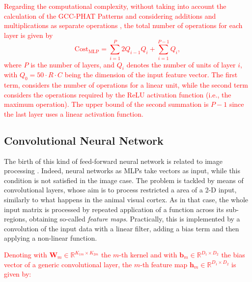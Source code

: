 \documentclass[review]{elsarticle}
\begin{document}
\textcolor{red}{Regarding the computational complexity, without taking into account the calculation of the GCC-PHAT Patterns and considering additions and multiplications as separate operations \cite{DoSY07}, the total number of operations for each layer is given by 
\begin{equation}
\text{Cost}_{\text{MLP}} = \sum_{i=1}^P 2Q_{i-1}Q_i + \sum_{i=1}^{P-1} Q_i ,
\end{equation}
where $P$ is the number of layers, and $Q_i$ denotes the number of units of layer $i$, with $Q_0=50\cdot R \cdot C$ being the dimension of the input feature vector. The first term, considers the number of operations for a linear unit, while the second term considers the operations required by the ReLU activation function (i.e., the maximum operation). The upper bound of the second summation is $P-1$ since the last layer uses a linear activation function.
}

\subsection{Convolutional Neural Network}
\label{sec:CNN}
The birth of this kind of feed-forward neural network is related to image processing \cite{lawrence1997face}. Indeed, neural networks as MLPs take vectors as input, while this condition is not satisfied in the image case. The problem is tackled by means of convolutional layers, whose aim is to process restricted a area of a 2-D input, similarly to what happens in the animal visual cortex.
As in that case, the whole input matrix is processed by repeated application of a function across its sub-regions, obtaining so-called \textit{feature maps}. Practically, this is implemented by a convolution of the input data with a linear filter, adding a bias term and then applying a non-linear function.

\textcolor{red}{
Denoting with $\mathbf{W}_{m} \in \mathbb{R}^{K_{1m}\times K_{2m}}$ the $m$-th kernel and with $\mathbf{b}_{m}  \in \mathbb{R}^{D_1\times D_2}$ the bias vector of a generic convolutional layer, the $m$-th feature map  $\mathbf{h}_{m} \in \mathbb{R}^{D_1\times D_2}$ is given by:}
\end{document}
